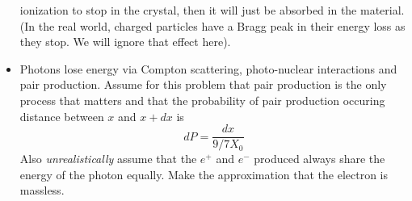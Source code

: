 \begin{itemize}
ionization to stop in the crystal, then it will just
be absorbed in the material. (In the real world, charged particles
have a Bragg peak in their energy loss as they stop. We will ignore
that effect here).
\item  Photons lose energy via Compton scattering, photo-nuclear 
interactions and pair production.  Assume for this problem
that pair production is
the only process that matters and that the probability of pair
production occuring distance between $x$  and $x+dx$ is
$$dP = \frac{dx}{9/7 X_0}$$
Also
{\it unrealistically} assume that the $e^+$ and $e^-$  produced 
always share the
energy of the photon equally.  Make the approximation that  the electron is massless.\\
\end{itemize}

